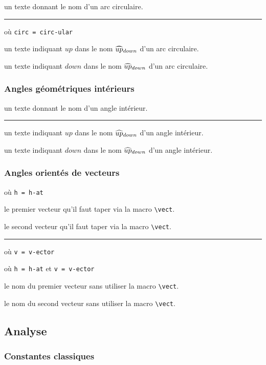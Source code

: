 \documentclass[12pt,a4paper]{article}
\newcommand\env[1]{\texttt{#1}}
\newcommand\macro[1]{\env{\textbackslash{}#1}}
\theoremstyle{definition}
\newcommand\separation{
	\medskip
	\hfill\rule{0.5\textwidth}{0.75pt}\hfill
	\medskip
}
\newcommand\mwhyprefix[2]{%
	\texttt{#1 = #1-#2}%
}
\begin{document}
\IDarg{} un texte donnant le nom d'un arc circulaire.


\separation


 où \quad \mwhyprefix{circ}{ular}

 un texte indiquant $up$ dans le nom $\circarc*{up}{down}$ d'un arc circulaire.

 un texte indiquant $down$ dans le nom $\circarc*{up}{down}$ d'un arc circulaire.
\subsubsection{Angles géométriques \og intérieurs \fg}


\IDarg{} un texte donnant le nom d'un angle intérieur.


\separation



 un texte indiquant $up$ dans le nom $\anglein*{up}{down}$ d'un angle intérieur.

 un texte indiquant $down$ dans le nom $\anglein*{up}{down}$ d'un angle intérieur.
\subsubsection{Angles orientés de vecteurs}


  où \quad \mwhyprefix{h}{at}

 le premier vecteur qu'il faut taper via la macro \macro{vect}.

 le second vecteur qu'il faut taper via la macro \macro{vect}.


\separation


 où \quad \mwhyprefix{v}{ector}

 où \quad \mwhyprefix{h}{at} et \mwhyprefix{v}{ector}

 le nom du premier vecteur sans utiliser la macro \macro{vect}.

 le nom du second vecteur sans utiliser la macro \macro{vect}.
\subsection{Analyse}

\subsubsection{Constantes classiques}
\end{document}
